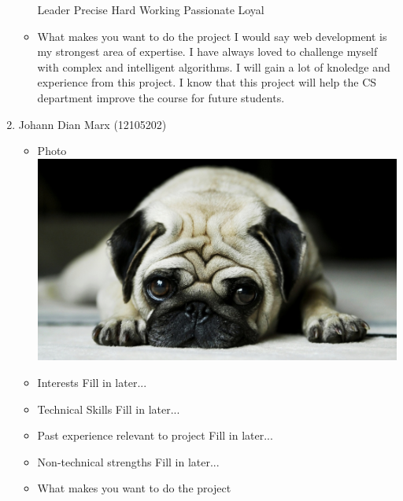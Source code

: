 \documentclass[12pt, oneside]{article}
\begin{document}
\begin{enumerate}
\begin{itemize}
Leader\newline
Precise\newline
Hard Working\newline
Passionate\newline
Loyal\newline
			\item What makes you want to do the project\newline\newline
				I would say web development is my strongest area of expertise. I have always loved to challenge myself 						with complex and intelligent algorithms. I will gain a lot of knoledge and experience from this 								project. I know that this project will help the CS department improve the course for future students.\newline
		\end{itemize}
		\item {Johann Dian Marx (12105202)\par}
		\begin{itemize}
			\item Photo\newline
				\includegraphics[scale=0.1]{example} %
			\item Interests\newline
				Fill in later...
			\item Technical Skills\newline
				Fill in later...
			\item Past experience relevant to project\newline
				Fill in later...
			\item Non-technical strengths\newline
				Fill in later...
			\item What makes you want to do the project\newline

\end{itemize}
\end{enumerate}
\end{document}
